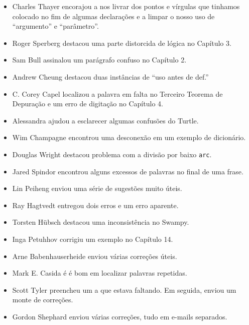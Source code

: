 \documentclass[10pt]{book}
\begin{document}
\begin {itemize}
\item Charles Thayer encorajou a nos livrar dos pontos e vírgulas
que tinhamos colocado no fim de algumas declarações e a limpar o nosso
uso de ``argumento'' e ``parâmetro''.

\item Roger Sperberg destacou uma parte distorcida de lógica no Capítulo 3.

\item Sam Bull assinalou um parágrafo confuso no Capítulo 2.

\item Andrew Cheung destacou duas instâncias de ``uso antes de def.''

\item C. Corey Capel localizou a palavra em falta no Terceiro Teorema
de Depuração e um erro de digitação no Capítulo 4.

\item Alessandra ajudou a esclarecer algumas confusões do Turtle.

\item Wim Champagne encontrou uma desconexão em um exemplo de dicionário.

\item Douglas Wright destacou problema com a divisão por baixo
{\tt arc}.

\item Jared Spindor encontrou alguns excessos de palavras no final de uma frase.

\item Lin Peiheng enviou uma série de sugestões muito úteis.

\item Ray Hagtvedt entregou dois erros e um erro aparente.

\item Torsten H\"{u}bsch destacou uma inconsistência no Swampy.

\item Inga Petuhhov corrigiu um exemplo no Capítulo 14.

\item Arne Babenhauserheide enviou várias correções úteis.

\item Mark E. Casida é é bom em localizar palavras repetidas.

\item Scott Tyler preencheu um a que estava faltando. Em seguida, enviou
um monte de correções.

\item Gordon Shephard enviou várias correções, tudo em e-mails
separados.


\end{itemize}
\end{document}
